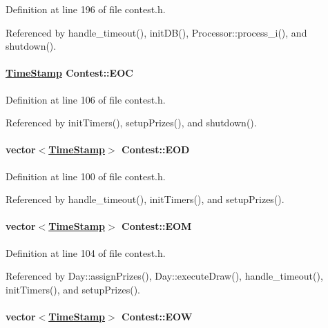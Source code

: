 Definition at line 196 of file contest.h.

Referenced by handle\_\-timeout(), init\-DB(), Processor::process\_\-i(), and shutdown().\hypertarget{classContest_Contestm4}{
\paragraph[EOC]{\setlength{\rightskip}{0pt plus 5cm}\hyperlink{classTimeStamp}{Time\-Stamp} Contest::EOC}\hfill}
\label{classContest_Contestm4}




Definition at line 106 of file contest.h.

Referenced by init\-Timers(), setup\-Prizes(), and shutdown().\hypertarget{classContest_Contestm1}{
\paragraph[EOD]{\setlength{\rightskip}{0pt plus 5cm}vector$<$\hyperlink{classTimeStamp}{Time\-Stamp}$>$ Contest::EOD}\hfill}
\label{classContest_Contestm1}




Definition at line 100 of file contest.h.

Referenced by handle\_\-timeout(), init\-Timers(), and setup\-Prizes().\hypertarget{classContest_Contestm3}{
\paragraph[EOM]{\setlength{\rightskip}{0pt plus 5cm}vector$<$\hyperlink{classTimeStamp}{Time\-Stamp}$>$ Contest::EOM}\hfill}
\label{classContest_Contestm3}




Definition at line 104 of file contest.h.

Referenced by Day::assign\-Prizes(), Day::execute\-Draw(), handle\_\-timeout(), init\-Timers(), and setup\-Prizes().\hypertarget{classContest_Contestm2}{
\paragraph[EOW]{\setlength{\rightskip}{0pt plus 5cm}vector$<$\hyperlink{classTimeStamp}{Time\-Stamp}$>$ Contest::EOW}\hfill}
\label{classContest_Contestm2}




